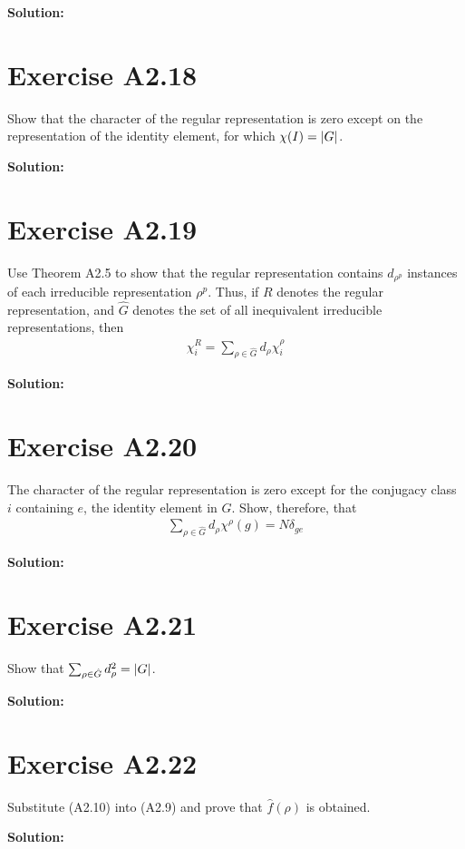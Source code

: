 \documentclass{book}
\begin{document}
    \textbf{Solution:}

\section*{Exercise A2.18}
    Show that the character of the regular representation is zero except on the representation of the identity element, for which $\chi(I) = \abs{G}$.
    
    \textbf{Solution:}
    
\section*{Exercise A2.19}
    Use Theorem A2.5 to show that the regular representation contains $d_{\rho^p}$ instances of each irreducible representation $\rho^p$. Thus, if $R$ denotes the regular representation, and $\hat{G}$ denotes the set of all inequivalent irreducible representations, then
    \begin{align}
        \chi_i^R = \sum_{\rho\in\hat{G}} d_\rho \chi_i^\rho
    \end{align}
    
    \textbf{Solution:}
    
\section*{Exercise A2.20}
    The character of the regular representation is zero except for the conjugacy class $i$ containing $e$, the identity element in $G$. Show, therefore, that
    \begin{align}
        \sum_{\rho\in\hat{G}} d_\rho \chi^{\rho}(g) = N \delta_{ge}
    \end{align}
    
    \textbf{Solution:}

\section*{Exercise A2.21}
    Show that $\sum_{\rho\in\hat{G}} d_\rho^2 = \abs{G}$.
    
    \textbf{Solution:}

\section*{Exercise A2.22}
    Substitute (A2.10) into (A2.9) and prove that $\hat{f}(\rho)$ is obtained.
    
    \textbf{Solution:}
\end{document}
